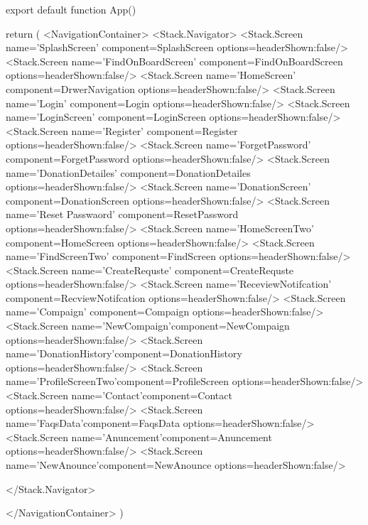 export default function App() {
  
  return (
    <NavigationContainer>
      <Stack.Navigator>
        <Stack.Screen name='SplashScreen' component={SplashScreen} options={{headerShown:false}}/>
        <Stack.Screen name='FindOnBoardScreen' component={FindOnBoardScreen} options={{headerShown:false}}/>
        <Stack.Screen name='HomeScreen' component={DrwerNavigation} options={{headerShown:false}}/>
        <Stack.Screen name='Login' component={Login} options={{headerShown:false}}/>
        <Stack.Screen name='LoginScreen' component={LoginScreen} options={{headerShown:false}}/>
        <Stack.Screen name='Register' component={Register} options={{headerShown:false}}/>
        <Stack.Screen name='ForgetPassword' component={ForgetPassword} options={{headerShown:false}}/>      
        <Stack.Screen name='DonationDetailes' component={DonationDetailes} options={{headerShown:false}}/>
        <Stack.Screen name='DonationScreen' component={DonationScreen} options={{headerShown:false}}/>
        <Stack.Screen name='Reset Passwaord' component={ResetPassword} options={{headerShown:false}}/>
        <Stack.Screen name='HomeScreenTwo' component={HomeScreen} options={{headerShown:false}}/>
        <Stack.Screen name='FindScreenTwo' component={FindScreen} options={{headerShown:false}}/>
        <Stack.Screen name='CreateRequste' component={CreateRequste} options={{headerShown:false}}/>
        <Stack.Screen name='ReceviewNotifcation' component={RecviewNotifcation} options={{headerShown:false}}/>
        <Stack.Screen name='Compaign' component={Compaign} options={{headerShown:false}}/>
        <Stack.Screen name='NewCompaign'component={NewCompaign} options={{headerShown:false}}/>
        <Stack.Screen name='DonationHistory'component={DonationHistory} options={{headerShown:false}}/>
        <Stack.Screen name='ProfileScreenTwo'component={ProfileScreen} options={{headerShown:false}}/>
        <Stack.Screen name='Contact'component={Contact} options={{headerShown:false}}/>
        <Stack.Screen name='FaqsData'component={FaqsData} options={{headerShown:false}}/>
        <Stack.Screen name='Anuncement'component={Anuncement} options={{headerShown:false}}/>
        <Stack.Screen name='NewAnounce'component={NewAnounce} options={{headerShown:false}}/>
      
      </Stack.Navigator>
      
    </NavigationContainer>
  )
}
